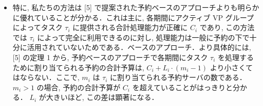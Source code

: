 \begin{frame}{}
    \begin{itemize}
        \item 特に, 私たちの方法は [5] で提案された予約ベースのアプローチよりも明らかに優れていることが分かる．これは主に, 各期間にアクティブ VP グループによってタスク $\tau_{i}$ に提供される合計処理能力が正確に $C_{i}$ であり, この方法では $\tau_{i}$ によって完全に利用できるのに対し, 処理能力は一般に予約の下で十分に活用されていないためである．ベースのアプローチ．より具体的には, [5] の定理 1 から, 予約ベースのアプローチで各期間にタスク $\tau_{i}$ を処理するために割り当てられる予約の合計予算は, $C_{i}+L_{i} \cdot\left(m_{i}-1\right)$ より小さくてはならない．ここで, $m_{i}$ は $\tau_{i}$ に割り当てられる予約サーバの数である． $m_{i}>1$ の場合, 予約の合計予算が $C_{i}$ を超えていることがはっきりと分かる． $L_{i}$ が大きいほど, この差は顕著になる．
    \end{itemize}
\end{frame}
